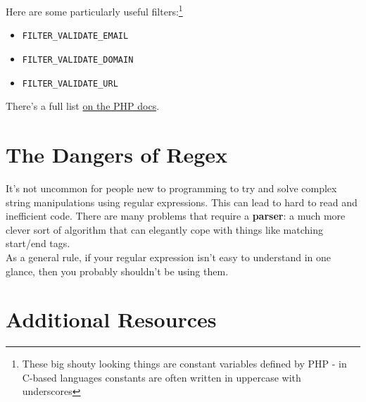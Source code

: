Here are some particularly useful filters:\footnote{These big shouty looking things are constant variables defined by PHP - in C-based languages constants are often written in uppercase with underscores}

\begin{itemize}
    \item \texttt{FILTER\_VALIDATE\_EMAIL}
    \item \texttt{FILTER\_VALIDATE\_DOMAIN}
    \item \texttt{FILTER\_VALIDATE\_URL}
\end{itemize}

There's a full list \href{https://www.php.net/manual/en/filter.filters.validate.php}{on the PHP docs}.



\section{The Dangers of Regex}


It's not uncommon for people new to programming to try and solve complex string manipulations using regular expressions. This can lead to hard to read and inefficient code. There are many problems that require a \textbf{parser}: a much more clever sort of algorithm that can elegantly cope with things like matching start/end tags.
\\

As a general rule, if your regular expression isn't easy to understand in one glance, then you probably shouldn't be using them.



\section{Additional Resources}

